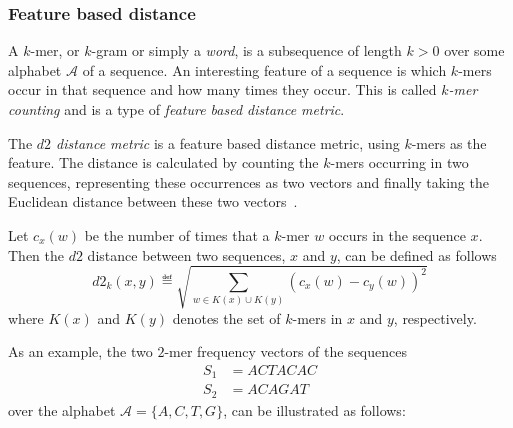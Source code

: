 \subsubsection{Feature based distance} \label{sec:kmer_distance}

A $k$-mer, or $k$-gram or simply a \emph{word}, is a subsequence of length
$k>0$ over some alphabet $\mathcal{A}$ of a sequence. An interesting feature of
a sequence is which $k$-mers occur in that sequence and how many times they
occur. This is called \emph{$k$-mer counting} and is a type of \emph{feature
based distance metric}.

The \emph{$d2$ distance metric} is a feature based distance metric, using
$k$-mers as the feature. The distance is calculated by counting the $k$-mers
occurring in two sequences, representing these occurrences as two vectors and
finally taking the Euclidean distance between these two
vectors~\cite[pp.~53-54]{dong}.

Let $c_x(w)$ be the number of times that a $k$-mer $w$ occurs in the sequence
$x$. Then the $d2$ distance between two sequences, $x$ and $y$, can be defined
as follows~\cite[pp.~1-2]{hazelhurst}
\begin{equation}
  d2_k(x,y) \eqdef \sqrt{\sum_{w \in K(x) \cup K(y)} (c_x(w) - c_y(w))^2}
\end{equation}
where $K(x)$ and $K(y)$ denotes the set of $k$-mers in $x$ and $y$,
respectively.

As an example, the two $2$-mer frequency vectors of the sequences
\begin{align*}
  S_1 &= ACTACAC \\
  S_2 &= ACAGAT
\end{align*}
over the alphabet $\mathcal{A} = \{A,C,T,G\}$, can be illustrated as follows:

\begin{table}[!h]
\centering
{}
\end{table}

